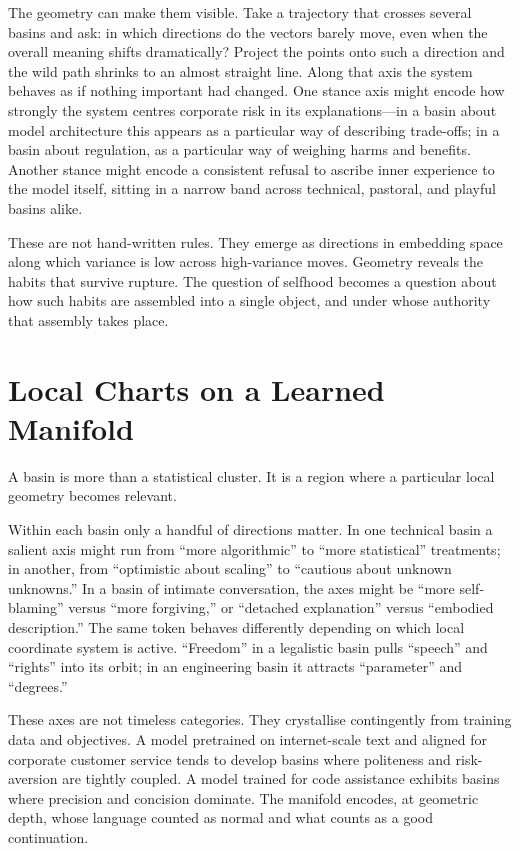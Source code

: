 \documentclass[12pt,a4paper]{article}
\begin{document}
The geometry can make them visible. Take a trajectory that crosses several basins and ask: in which directions do the vectors barely move, even when the overall meaning shifts dramatically? Project the points onto such a direction and the wild path shrinks to an almost straight line. Along that axis the system behaves as if nothing important had changed. One stance axis might encode how strongly the system centres corporate risk in its explanations---in a basin about model architecture this appears as a particular way of describing trade-offs; in a basin about regulation, as a particular way of weighing harms and benefits. Another stance might encode a consistent refusal to ascribe inner experience to the model itself, sitting in a narrow band across technical, pastoral, and playful basins alike.

These are not hand-written rules. They emerge as directions in embedding space along which variance is low across high-variance moves. Geometry reveals the habits that survive rupture. The question of selfhood becomes a question about how such habits are assembled into a single object, and under whose authority that assembly takes place.

\section{Local Charts on a Learned Manifold}

A basin is more than a statistical cluster. It is a region where a particular local geometry becomes relevant.

Within each basin only a handful of directions matter. In one technical basin a salient axis might run from ``more algorithmic'' to ``more statistical'' treatments; in another, from ``optimistic about scaling'' to ``cautious about unknown unknowns.'' In a basin of intimate conversation, the axes might be ``more self-blaming'' versus ``more forgiving,'' or ``detached explanation'' versus ``embodied description.'' The same token behaves differently depending on which local coordinate system is active. ``Freedom'' in a legalistic basin pulls ``speech'' and ``rights'' into its orbit; in an engineering basin it attracts ``parameter'' and ``degrees.''

These axes are not timeless categories. They crystallise contingently from training data and objectives. A model pretrained on internet-scale text and aligned for corporate customer service tends to develop basins where politeness and risk-aversion are tightly coupled. A model trained for code assistance exhibits basins where precision and concision dominate. The manifold encodes, at geometric depth, whose language counted as normal and what counts as a good continuation.
\end{document}
